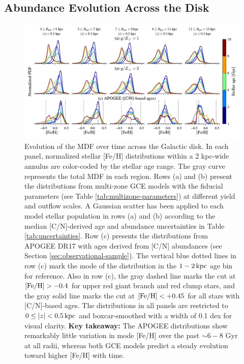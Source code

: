 \documentclass[twocolumn,twocolappendix,linenumbers]{aastex631}
\newcommand{\mathFeH}{{\rm [Fe/H]}}
\newcommand{\kpc}{\,{\rm kpc}}
\begin{document}
\subsection{Abundance Evolution Across the Disk}
\label{sec:disk-evolution}

\begin{figure}
    \centering
    \includegraphics[width=\textwidth]{figures/mdf_evolution.pdf}
    \caption{Evolution of the MDF over time across the Galactic disk. In each panel, normalized stellar [Fe/H] distributions within a {2 kpc}-wide annulus are color-coded by the stellar age range. The gray curve represents the total MDF in each region. Rows (a) and (b) present the distributions from multi-zone GCE models with the fiducial parameters (see Table \ref{tab:multizone-parameters}) at different yield and outflow scales. 
    A Gaussian scatter has been applied to each model stellar population in rows (a) and (b) according to the median [C/N]-derived age and abundance uncertainties in Table \ref{tab:uncertainties}. Row (c) presents the distributions from APOGEE DR17 with ages derived from [C/N] abundances (see Section \ref{sec:observational-sample}). The vertical blue dotted lines in row (c) mark the mode of the distribution in the $1-2\kpc$ age bin for reference. Also in row (c), the gray dashed line marks the cut at $\mathFeH>-0.4$ for upper red giant branch and red clump stars, and the gray solid line marks the cut at $\mathFeH<+0.45$ for all stars with [C/N]-based ages. The distributions in all panels are restricted to $0\leq|z|<0.5\kpc$ and boxcar-smoothed with a width of {0.1 dex} for visual clarity. {\bf Key takeaway:} The APOGEE distributions show remarkably little variation in mode [Fe/H] over the past $\sim6-8$ Gyr at all radii, whereas both GCE models predict a steady evolution toward higher [Fe/H] with time.}
    \label{fig:mdf-evolution}
\end{figure}
\end{document}
